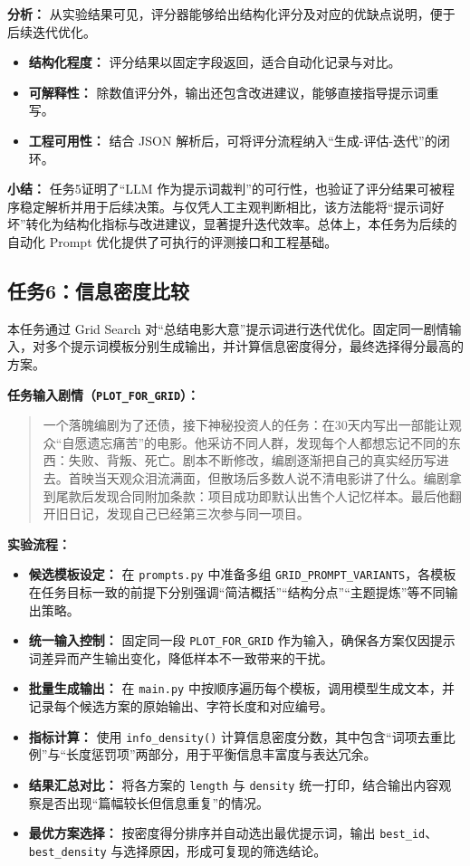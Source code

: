 \documentclass[UTF8, a4paper, 12pt]{ctexart}
\begin{document}
\textbf{分析：}
从实验结果可见，评分器能够给出结构化评分及对应的优缺点说明，便于后续迭代优化。
\begin{itemize}
  \item \textbf{结构化程度：} 评分结果以固定字段返回，适合自动化记录与对比。
  \item \textbf{可解释性：} 除数值评分外，输出还包含改进建议，能够直接指导提示词重写。
  \item \textbf{工程可用性：} 结合 JSON 解析后，可将评分流程纳入“生成-评估-迭代”的闭环。
\end{itemize}

\textbf{小结：}
任务5证明了“LLM 作为提示词裁判”的可行性，也验证了评分结果可被程序稳定解析并用于后续决策。与仅凭人工主观判断相比，该方法能将“提示词好坏”转化为结构化指标与改进建议，显著提升迭代效率。总体上，本任务为后续的自动化 Prompt 优化提供了可执行的评测接口和工程基础。

\subsection{任务6：信息密度比较}

本任务通过 Grid Search 对“总结电影大意”提示词进行迭代优化。固定同一剧情输入，对多个提示词模板分别生成输出，并计算信息密度得分，最终选择得分最高的方案。

\vspace{0.5cm}
\textbf{任务输入剧情（\texttt{PLOT\_FOR\_GRID}）：}
\begin{quote}
一个落魄编剧为了还债，接下神秘投资人的任务：在30天内写出一部能让观众“自愿遗忘痛苦”的电影。他采访不同人群，发现每个人都想忘记不同的东西：失败、背叛、死亡。剧本不断修改，编剧逐渐把自己的真实经历写进去。首映当天观众泪流满面，但散场后多数人说不清电影讲了什么。编剧拿到尾款后发现合同附加条款：项目成功即默认出售个人记忆样本。最后他翻开旧日记，发现自己已经第三次参与同一项目。
\end{quote}

\vspace{0.5cm}
\textbf{实验流程：}
\begin{itemize}
  \item \textbf{候选模板设定：} 在 \texttt{prompts.py} 中准备多组 \texttt{GRID\_PROMPT\_VARIANTS}，各模板在任务目标一致的前提下分别强调“简洁概括”“结构分点”“主题提炼”等不同输出策略。
  \item \textbf{统一输入控制：} 固定同一段 \texttt{PLOT\_FOR\_GRID} 作为输入，确保各方案仅因提示词差异而产生输出变化，降低样本不一致带来的干扰。
  \item \textbf{批量生成输出：} 在 \texttt{main.py} 中按顺序遍历每个模板，调用模型生成文本，并记录每个候选方案的原始输出、字符长度和对应编号。
  \item \textbf{指标计算：} 使用 \texttt{info\_density()} 计算信息密度分数，其中包含“词项去重比例”与“长度惩罚项”两部分，用于平衡信息丰富度与表达冗余。
  \item \textbf{结果汇总对比：} 将各方案的 \texttt{length} 与 \texttt{density} 统一打印，结合输出内容观察是否出现“篇幅较长但信息重复”的情况。
  \item \textbf{最优方案选择：} 按密度得分排序并自动选出最优提示词，输出 \texttt{best\_id}、\texttt{best\_density} 与选择原因，形成可复现的筛选结论。
\end{itemize}
\end{document}
